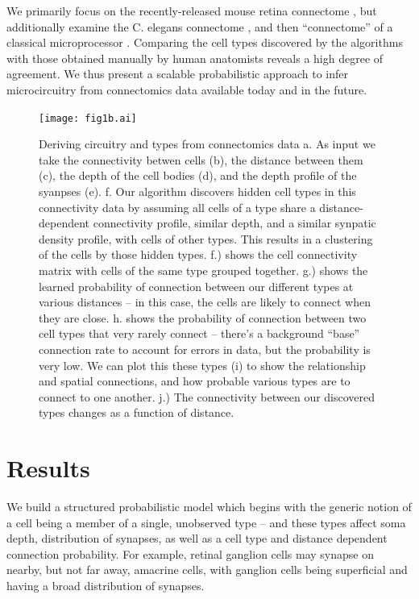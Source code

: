 \documentclass{article}
\begin{document}
We primarily focus on the recently-released mouse retina connectome
\autocite{Helmstaedter2013}, but additionally examine the C. elegans
connectome \autocite{White1986}, and then ``connectome'' of a
classical microprocessor \autocite{James2010}. Comparing the cell
types discovered by the algorithms with those obtained manually by
human anatomists reveals a high degree of agreement. We thus present a
scalable probabilistic approach to infer microcircuitry from
connectomics data available today and in the future. 

\begin{figure}
  \centering 
  \centerline{\texttt{[image: fig1b.ai]}}
  \caption{Deriving circuitry and types from connectomics data a. As input we take the connectivity betwen cells (b), the distance between them (c), the depth of the cell bodies (d), and the depth profile of the syanpses (e). f. Our algorithm discovers hidden cell types in this
    connectivity data by assuming all cells of a type share a
    distance-dependent connectivity profile, similar depth, and a
    similar synpatic density profile, with cells of other types.  This
    results in a clustering of the cells by those hidden
    types. f.) shows the cell connectivity matrix with cells of the
    same type grouped together. g.) shows the learned probability of
    connection between our different types at various distances -- in
    this case, the cells are likely to connect when they are
    close. h. shows the probability of connection between two cell types
that very rarely connect -- there's a background ``base'' connection rate
to account for errors in data, but the probability is very low. 
We can plot this these types (i) to show the relationship and spatial
connections, and how probable various types are to connect to one
another. j.) The connectivity between our discovered types changes as a
function of distance. }

\label{fig:overview}
\end{figure}

\section*{Results}

We build a structured probabilistic model which begins with the
generic notion of a cell being a member of a single, unobserved type
-- and these types affect soma depth, distribution of synapses, as
well as a cell type and distance dependent connection probability. For
example, retinal ganglion cells may synapse on nearby, but not far
away, amacrine cells, with ganglion cells being superficial and having
a broad distribution of synapses.  
\end{document}
